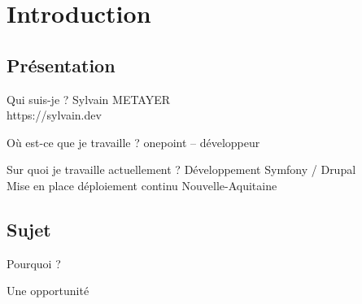 \section{Introduction}

\subsection{Présentation}

\begin{frame}{\subsecname}
	\begin{block}{Qui suis-je ?}
	Sylvain METAYER \\ 
	https://sylvain.dev
	\end{block}
	\pause
	\begin{block}{Où est-ce que je travaille ?}
	onepoint -- développeur
	\end{block}
	\pause
	\begin{block}{Sur quoi je travaille actuellement ?}
	Développement Symfony / Drupal\\ 	
	Mise en place déploiement continu Nouvelle-Aquitaine
	\end{block}
\end{frame}

\subsection{Sujet}
\begin{frame}{\subsecname}
	 \begin{overprint}
			\begin{block}{Pourquoi ?}
			\end{block}
			\begin{block}{Une opportunité}
			\end{block}
	\end{overprint} 
\end{frame}

